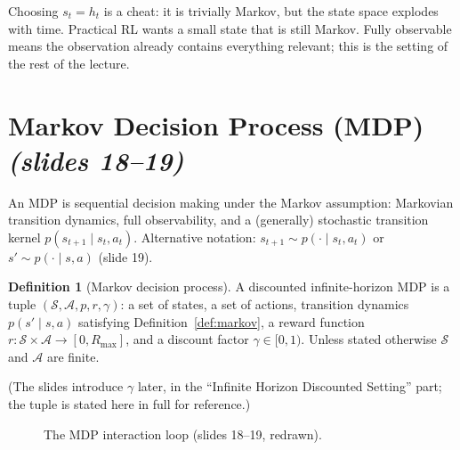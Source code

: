 \documentclass[11pt,a4paper]{article}
\newcommand{\slr}[1]{\texorpdfstring{\emph{(slides #1)}}{(slides #1)}}
\newcommand{\cS}{\mathcal{S}}
\newcommand{\cA}{\mathcal{A}}
\newcommand{\Rmax}{R_{\max}}
\theoremstyle{plain}
\theoremstyle{definition}
\newtheorem{definition}[theorem]{Definition}
\theoremstyle{remark}
\begin{document}
\begin{intuition}
Choosing $s_t=h_t$ is a cheat: it is trivially Markov, but the state space explodes with time. Practical RL wants a small state that is still Markov. Fully observable means the observation already contains everything relevant; this is the setting of the rest of the lecture.
\end{intuition}

\section{Markov Decision Process (MDP) \slr{18--19}}
An MDP is sequential decision making under the Markov assumption: Markovian transition dynamics, full observability, and a (generally) stochastic transition kernel $p(s_{t+1}\mid s_t,a_t)$. Alternative notation: $s_{t+1}\sim p(\cdot\mid s_t,a_t)$ or $s'\sim p(\cdot\mid s,a)$ (slide 19).

\begin{definition}[Markov decision process]\label{def:mdp}
A discounted infinite-horizon MDP is a tuple $(\cS,\cA,p,r,\gamma)$: a set of states, a set of actions, transition dynamics $p(s'\mid s,a)$ satisfying Definition~\ref{def:markov}, a reward function $r:\cS\times\cA\to[0,\Rmax]$, and a discount factor $\gamma\in[0,1)$. Unless stated otherwise $\cS$ and $\cA$ are finite.
\end{definition}
(The slides introduce $\gamma$ later, in the ``Infinite Horizon Discounted Setting'' part; the tuple is stated here in full for reference.)

\begin{figure}[htbp]
\centering
{}
\caption{The MDP interaction loop (slides 18--19, redrawn).}
\end{figure}
\end{document}
